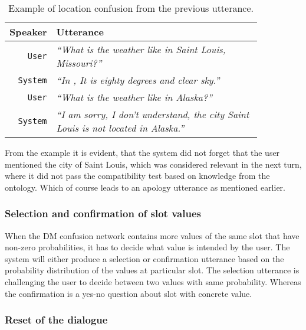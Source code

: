 \begin{table}[h]
\centering
\begin{tabular}{ | r | p{0.85\linewidth} | } \hline
	Speaker & Utterance \\ \hline
	\texttt{User} & \textit{``What is the weather like in Saint Louis, Missouri?''} \\ \hline
	\texttt{System} & \textit{``In , It is eighty degrees and clear sky.''} \\ \hline
	\texttt{User} & \textit{``What is the weather like in Alaska?''} \\ \hline
	\texttt{System} & \textit{``I am sorry, I don't understand, the city Saint Louis is not located in Alaska.''} \\ \hline
\end{tabular}
\caption[Orthogonal time queries]{Example of location confusion from the previous utterance.}
\label{table:confusion}
\end{table}

From the example it is evident, that the system did not forget that the user mentioned the city of Saint Louis, which was considered relevant in the next turn, where it did not pass the compatibility test based on knowledge from the ontology.
Which of course leads to an apology utterance as mentioned earlier.


\subsubsection{Selection and confirmation of slot values}

When the DM confusion network contains more values of the same slot that have non-zero probabilities, it has to decide what value is intended by the user.
The system will either produce a selection or confirmation utterance based on the probability distribution of the values at particular slot.
The selection utterance is challenging the user to decide between two values with same probability.
Whereas the confirmation is a yes-no question about slot with concrete value.


\subsubsection{Reset of the dialogue}

